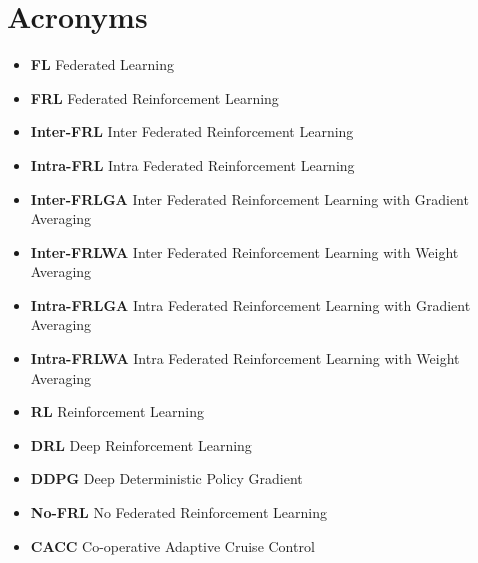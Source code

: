 \documentclass[oneside, 12pt]{book}
\begin{document}
\chapter*{Acronyms}
\begin{itemize}[label={}]
	\singlespacing
	\item \textbf{FL} Federated Learning \\
	\item \textbf{FRL} Federated Reinforcement Learning \\
	\item \textbf{Inter-FRL}  Inter Federated Reinforcement Learning \\
	\item \textbf{Intra-FRL}  Intra Federated Reinforcement Learning \\
	\item \textbf{Inter-FRLGA} Inter Federated Reinforcement Learning with Gradient Averaging \\
	\item \textbf{Inter-FRLWA} Inter Federated Reinforcement Learning with Weight Averaging \\
	\item \textbf{Intra-FRLGA} Intra Federated Reinforcement Learning with Gradient Averaging \\
	\item \textbf{Intra-FRLWA} Intra Federated Reinforcement Learning with Weight Averaging \\
	\item \textbf{RL} Reinforcement Learning \\
	\item \textbf{DRL} Deep Reinforcement Learning \\
	\item \textbf{DDPG} Deep Deterministic Policy Gradient \\
	\item \textbf{No-FRL}  No Federated Reinforcement Learning \\
	\item \textbf{CACC} Co-operative Adaptive Cruise Control
\end{itemize}
\doublespacing









\end{document}
